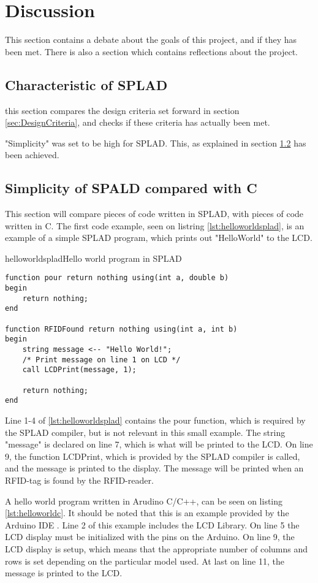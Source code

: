 \section{Discussion}
\label{sec:discussion}
This section contains a debate about the goals of this project, and if they has been met. There is also a section which contains reflections about the project.

\subsection{Characteristic of SPLAD}
this section compares the design criteria set forward in section \ref{sec:DesignCriteria}, and checks if these criteria has actually been met.

"Simplicity" was set to be high for SPLAD. This, as explained in section \ref{sec:simplespladc} has been achieved. 

\subsection{Simplicity of SPALD compared with C}
\label{sec:simplespladc}
This section will compare pieces of code written in SPLAD, with pieces of code written in C. The first code example, seen on listring \ref{lst:helloworldsplad}, is an example of a simple SPLAD program, which prints out "HelloWorld" to the LCD.

\begin{code}{helloworldsplad}{Hello world program in SPLAD}
\begin{lstlisting}
function pour return nothing using(int a, double b)
begin
	return nothing;
end

function RFIDFound return nothing using(int a, int b)
begin
	string message <-- "Hello World!";
	/* Print message on line 1 on LCD */
	call LCDPrint(message, 1);

	return nothing;
end
\end{lstlisting}
\end{code}

Line 1-4 of \ref{lst:helloworldsplad} contains the pour function, which is required by the SPLAD compiler, but is not relevant in this small example. The string "message" is declared on line 7, which is what will be printed to the LCD. On line 9, the function LCDPrint, which is provided by the SPLAD compiler is called, and the message is printed to the display. The message will be printed when an RFID-tag is found by the RFID-reader.

A hello world program written in Arudino C/C++, can be seen on listing \ref{lst:helloworldc}. It should be noted that this is an example provided by the Arduino IDE \citep{LCDtut}. Line 2 of this example includes the LCD Library. On line 5 the LCD display must be initialized with the pins on the Arduino. On line 9, the LCD display is setup, which means that the appropriate number of columns and rows is set depending on the particular model used. At last on line 11, the message is printed to the LCD.
 
